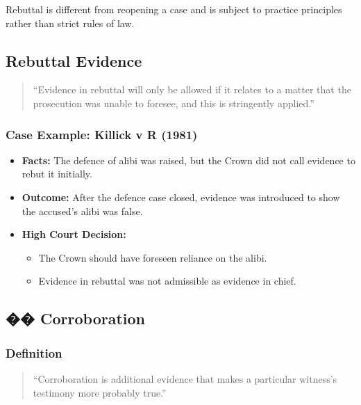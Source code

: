 Rebuttal is different from reopening a case and is subject to practice
principles rather than strict rules of law.

\subsection{  Rebuttal Evidence}\label{rebuttal-evidence}

\begin{quote}
``Evidence in rebuttal will only be allowed if it relates to a matter
that the prosecution was unable to foresee, and this is stringently
applied.''
\end{quote}

\subsubsection{Case Example: Killick v R
(1981)}\label{case-example-killick-v-r-1981}

\begin{itemize}
\tightlist
\item
  \textbf{Facts:} The defence of alibi was raised, but the Crown did not
  call evidence to rebut it initially.
\item
  \textbf{Outcome:} After the defence case closed, evidence was
  introduced to show the accused's alibi was false.
\item
  \textbf{High Court Decision:}

  \begin{itemize}
  \tightlist
  \item
    The Crown should have foreseen reliance on the alibi.
  \item
    Evidence in rebuttal was not admissible as evidence in chief.
  \end{itemize}
\end{itemize}

\subsection{�� Corroboration}\label{corroboration}

\subsubsection{Definition}\label{definition-1}

\begin{quote}
``Corroboration is additional evidence that makes a particular witness's
testimony more probably true.''
\end{quote}

